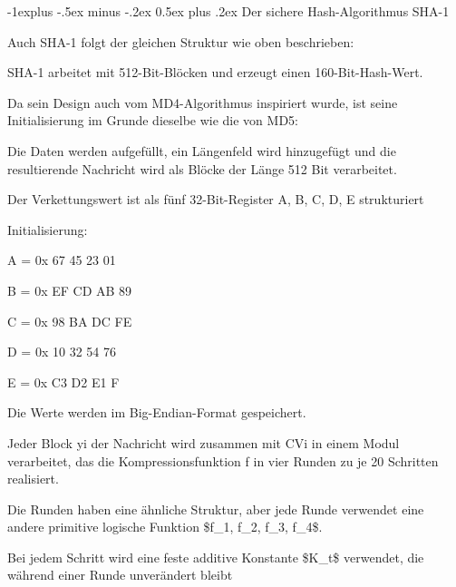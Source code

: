 \documentclass[a4paper]{article}
\makeatletter
\renewcommand{\subsection}{\@startsection{subsection}{2}{0mm}%
 {-1explus -.5ex minus -.2ex}%
 {0.5ex plus .2ex}%
 {\normalfont\normalsize\bfseries}}
\makeatother
\begin{document}
\begin{multicols}{3}
      \subsection{Der sichere Hash-Algorithmus
            SHA-1}

      \begin{itemize*}
            \item Auch SHA-1 folgt der gleichen Struktur wie oben beschrieben:
            \begin{itemize*}
                  \item SHA-1 arbeitet mit 512-Bit-Blöcken und erzeugt einen 160-Bit-Hash-Wert.
                  \item Da sein Design auch vom MD4-Algorithmus inspiriert wurde, ist seine Initialisierung im Grunde dieselbe wie die von MD5:
                  \begin{itemize*} \item Die Daten werden aufgefüllt, ein Längenfeld wird hinzugefügt und die resultierende Nachricht wird als Blöcke der Länge 512 Bit verarbeitet. \item Der Verkettungswert ist als fünf 32-Bit-Register A, B, C, D, E strukturiert \item Initialisierung:
                        \begin{itemize*} \item A = 0x 67 45 23 01 \item B = 0x EF CD AB 89 \item C = 0x 98 BA DC FE \item D = 0x 10 32 54 76 \item E = 0x C3 D2 E1 F \end{itemize*} \item Die Werte werden im Big-Endian-Format gespeichert. \end{itemize*}
                  \item Jeder Block yi der Nachricht wird zusammen mit CVi in einem Modul verarbeitet, das die Kompressionsfunktion f in vier Runden zu je 20 Schritten realisiert.
                  \begin{itemize*} \item Die Runden haben eine ähnliche Struktur, aber jede Runde verwendet eine andere primitive logische Funktion \$f\_1, f\_2, f\_3, f\_4\$. \item Bei jedem Schritt wird eine feste additive Konstante \$K\_t\$ verwendet, die während einer Runde unverändert bleibt \end{itemize*}
            \end{itemize*}

\end{itemize*}
\end{multicols}
\end{document}
